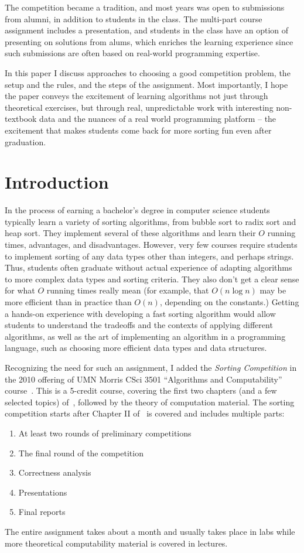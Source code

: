 \documentclass[12pt]{article}
\begin{document}
The competition became a tradition, and most years was open to submissions from alumni, in addition to students in the class. 
The multi-part course assignment includes a presentation, and students in the class have an option of presenting on solutions from alums, which enriches the learning experience since such submissions are often based on real-world programming expertise. 

In this paper I discuss approaches to choosing a good competition problem, the setup and the rules, and the steps of the assignment. Most importantly, I hope the paper conveys the excitement of learning algorithms not just through theoretical exercises, but through real, unpredictable work with interesting non-textbook data and the nuances of a real world programming platform – the excitement that makes students come back for more sorting fun even after graduation. 


\newpage
\setcounter{page}{1}
\section{Introduction}\label{sec:intro}
In the process of earning a bachelor's degree in computer science students typically learn a variety of sorting algorithms, from bubble sort to radix sort and heap sort. They implement several of these algorithms and learn their $O$ running times, advantages, and disadvantages. However, very few courses require students to implement sorting of any data types other than integers, and perhaps strings. Thus, students often graduate without actual experience of adapting algorithms to more complex data types and sorting criteria. They also don't get a clear sense for what $O$ running times really mean (for example, that $O(n \log n)$ may be more efficient than in practice than $O(n)$, depending on the constants.) 
Getting a hands-on experience with developing a fast sorting algorithm would allow students to understand the tradeoffs and the contexts of applying different algorithms, as well as the art of implementing an algorithm in a programming language, such as choosing more efficient data types and data structures.    

Recognizing the need for such an assignment, I added the \textit{Sorting Competition} in the 2010 offering of UMN Morris CSci 3501 ``Algorithms and Computability'' course~\cite{mics2011}.  This is a 5-credit course, covering the first two chapters (and a few selected topics) of~\cite{CLRS}, followed by the theory of computation material. The sorting competition starts after Chapter II of~\cite{CLRS} is covered and includes multiple parts:
\begin{enumerate}
\item At least two rounds of preliminary competitions
\item The final round of the competition
\item Correctness analysis
\item Presentations
\item Final reports
\end{enumerate}
The entire assignment takes about a month and usually takes place in labs while more theoretical computability material is covered in lectures. 
\end{document}
